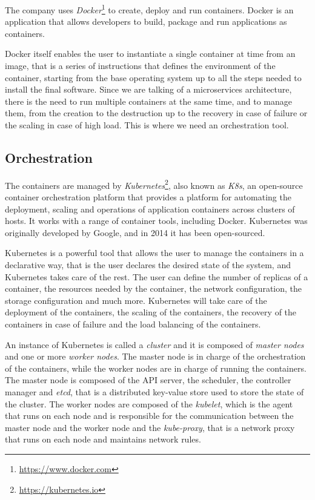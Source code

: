 The company uses \textit{Docker}\footnote{\url{https://www.docker.com}} to create, deploy and run containers. Docker is an application that allows developers to build, package and run applications as containers.

Docker itself enables the user to instantiate a single container at time from an image, that is a series of instructions that defines the environment of the container, starting from the base operating system up to all the steps needed to install the final software. Since we are talking of a microservices architecture, there is the need to run multiple containers at the same time, and to manage them, from the creation to the destruction up to the recovery in case of failure or the scaling in case of high load. This is where we need an orchestration tool.

\subsection{Orchestration}

The containers are managed by \textit{Kubernetes}\footnote{\url{https://kubernetes.io}}, also known as \textit{K8s}, an open-source container orchestration platform that provides a platform for automating the deployment, scaling and operations of application containers across clusters of hosts. It works with a range of container tools, including Docker. Kubernetes was originally developed by Google, and in 2014 it has been open-sourced.~\cite{kubernetes-overview}

Kubernetes is a powerful tool that allows the user to manage the containers in a declarative way, that is the user declares the desired state of the system, and Kubernetes takes care of the rest. The user can define the number of replicas of a container, the resources needed by the container, the network configuration, the storage configuration and much more. Kubernetes will take care of the deployment of the containers, the scaling of the containers, the recovery of the containers in case of failure and the load balancing of the containers.

An instance of Kubernetes is called a \textit{cluster} and it is composed of \textit{master nodes} and one or more \textit{worker nodes}. The master node is in charge of the orchestration of the containers, while the worker nodes are in charge of running the containers. The master node is composed of the API server, the scheduler, the controller manager and \textit{etcd}, that is a distributed key-value store used to store the state of the cluster. The worker nodes are composed of the \textit{kubelet}, which is the agent that runs on each node and is responsible for the communication between the master node and the worker node and the \textit{kube-proxy}, that is a network proxy that runs on each node and maintains network rules.

